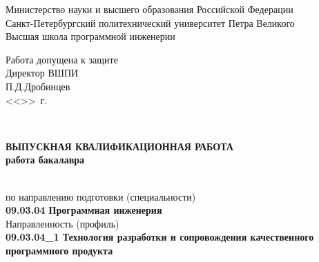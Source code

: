 \begin{titlepage}

  \begin{center} %



    Министерство науки и высшего образования Российской Федерации\\
    Санкт-Петербургский политехнический университет Петра Великого\\
    Высшая школа программной инженерии\\[0.9cm]

    \newlength{\charwidth}
    \setlength{\charwidth}{\widthof{\_}}

    \begin{flushright}
      \begin{minipage}{0.505\linewidth}
          Работа допущена к защите                                                               \\
          Директор ВШПИ                                                                          \\
          \underline{\hspace*{11\charwidth}} П.Д.Дробинцев                                   \\
          <<\underline{\hspace*{3\charwidth}}>>\underline{\hspace*{15\charwidth}}\the\year{}~г.
      \end{minipage}\\
    \end{flushright}

    {\Large \bfseries ВЫПУСКНАЯ КВАЛИФИКАЦИОННАЯ РАБОТА}\\[0.4cm]
    {\Large \bfseries работа бакалавра}\\[1.5cm]


    {\Large \bfseries \MakeUppercase{\Theme}}\\[0.7cm] %

    {
    \begin{flushleft}
      по направлению подготовки (специальности)\\[0.4cm]
      \textbf{09.03.04 Программная инженерия}\\[0.2cm]
      Направленность (профиль)\\[0.2cm]
      \textbf{09.03.04\_1 Технология разработки и сопровождения качественного программного продукта}\\[0.6cm]
    \end{flushleft}
    }


\end{center}
\end{titlepage}
